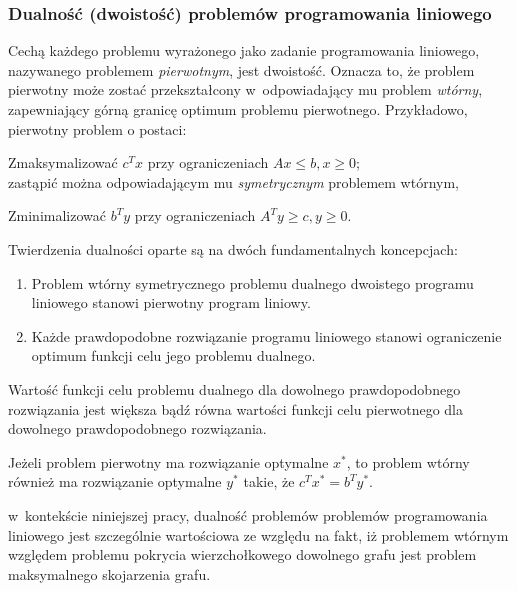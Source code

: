 \subsubsection{\textbf{Dualność (dwoistość) problemów programowania liniowego}}
\label{sss_lp_duality}
\par{
  Cechą każdego problemu wyrażonego jako zadanie programowania liniowego,
  nazywanego problemem \emph{pierwotnym}, jest dwoistość.
  Oznacza to, że problem pierwotny może zostać przekształcony w~odpowiadający mu
  problem \emph{wtórny}, zapewniający górną granicę optimum problemu
  pierwotnego. 
  Przykładowo, pierwotny problem o postaci:\par
  Zmaksymalizować $c^{T}x$ przy ograniczeniach $Ax\leq b, x \geq 0$;\\
  zastąpić można odpowiadającym mu \emph{symetrycznym} problemem wtórnym,\par
  Zminimalizować $b^{T}y$ przy ograniczeniach $A^{T}y \geq c, y \geq 0$.\\
}
\par{
  Twierdzenia dualności oparte są na dwóch fundamentalnych koncepcjach:
  \begin{enumerate}
    \item Problem wtórny symetrycznego problemu dualnego dwoistego programu
      liniowego stanowi pierwotny program liniowy.
    \item Każde prawdopodobne rozwiązanie programu liniowego stanowi
      ograniczenie optimum funkcji celu jego problemu dualnego.
  \end{enumerate}

  \begin{theorem}
    Wartość funkcji celu problemu dualnego dla dowolnego prawdopodobnego
    rozwiązania jest większa bądź równa wartości funkcji celu pierwotnego dla
    dowolnego prawdopodobnego rozwiązania.
  \end{theorem}
  \begin{theorem}
    Jeżeli problem pierwotny ma rozwiązanie optymalne $x^*$, to problem 
    wtórny również ma rozwiązanie optymalne $y^*$ takie, że $c^{T}x^*=b^{T}y^*$.
  \end{theorem}
}

\par{
  w~kontekście niniejszej pracy, dualność problemów problemów programowania
  liniowego jest szczególnie wartościowa ze względu na fakt, iż problemem
  wtórnym względem problemu pokrycia wierzchołkowego dowolnego grafu jest 
  problem maksymalnego skojarzenia grafu.
}

